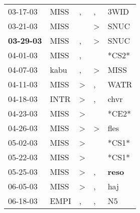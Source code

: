 \begin{supertabular}{p{0.07\textwidth}p{0.06\textwidth}p{0.02\textwidth}p{0.02\textwidth}p{0.06\textwidth}}
          03-17-03\textsuperscript{} &           MISS\textsuperscript{} &                , &                , &           3WID\textsuperscript{} \\
          03-21-03\textsuperscript{} &           MISS\textsuperscript{} &                  &     \textgreater &           SNUC\textsuperscript{} \\
 \textbf{03-29-03\textsuperscript{}} &           MISS\textsuperscript{} &                , &     \textgreater &           SNUC\textsuperscript{} \\
          04-01-03\textsuperscript{} &           MISS\textsuperscript{} &                , &                  &                            *CS2* \\
          04-07-03\textsuperscript{} &           kabu\textsuperscript{} &                , &     \textgreater &           MISS\textsuperscript{} \\
          04-11-03\textsuperscript{} &           MISS\textsuperscript{} &     \textgreater &                , &           WATR\textsuperscript{} \\
          04-18-03\textsuperscript{} &           INTR\textsuperscript{} &     \textgreater &                , &           chvr\textsuperscript{} \\
          04-23-03\textsuperscript{} &           MISS\textsuperscript{} &     \textgreater &                  &                            *CE2* \\
          04-26-03\textsuperscript{} &           MISS\textsuperscript{} &     \textgreater &     \textgreater &           fles\textsuperscript{} \\
          05-02-03\textsuperscript{} &           MISS\textsuperscript{} &     \textgreater &                  &                            *CS1* \\
          05-22-03\textsuperscript{} &           MISS\textsuperscript{} &     \textgreater &                  &                            *CS1* \\
          05-25-03\textsuperscript{} &           MISS\textsuperscript{} &     \textgreater &                , &  \textbf{reso\textsuperscript{}} \\
          06-05-03\textsuperscript{} &           MISS\textsuperscript{} &     \textgreater &                , &            haj\textsuperscript{} \\
          06-18-03\textsuperscript{} &           EMPI\textsuperscript{} &                , &                , &             N5\textsuperscript{} \\

\end{supertabular}
